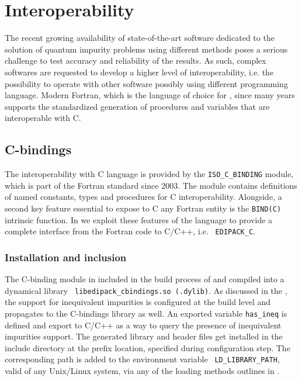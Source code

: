 \documentclass[edipack_sp.tex]{subfiles}
\begin{document}
\section{Interoperability}\label{SecInterop}
The recent growing availability of state-of-the-art software dedicated
to the solution of quantum impurity problems using different methods \cite{Bulla2008RMP,Parcollet2015CPC,Seth2016CPC,Bauernfeind2017PRX,Ganahl2015PRB,Mejuto_Bath_ASCI-DMFT,...}
poses a serious challenge to test accuracy and reliability of the
results.
As such, complex softwares are requested to develop a higher level of
interoperability, i.e. the possibility to operate with other software
possibly using different programming language.
Modern Fortran, which is the language of choice for \NAME, since many
years supports the standardized generation of procedures and
variables that are interoperable with C.


\subsection{C-bindings}\label{sSecInteropCbindings}
The interoperability with C language is provided by the
{\tt ISO\_C\_BINDING} module, which is part of the Fortran
standard since 2003. The module contains definitions of named
constants, types and procedures for C interoperability.
Alongside, a second key feature essential to expose to C any Fortran
entity is the {\tt BIND(C)} intrinsic function.
In \NAME we exploit these features of the language to provide a
complete interface from the Fortran code to C/C++, i.e. {\tt
  EDIPACK\_C}. 


\subsubsection{Installation and inclusion}\label{sSecInteropCbindingsInstallation}
The C-binding module in included in the build process of \NAME and
compiled into a dynamical library {\tt
  libedipack\_cbindings.so (.dylib)}. As discussed in the
, the support for inequivalent
impurities is configured at the build level and propagates to the
C-bindings library as well. An exported variable {\tt has\_ineq} is
defined and export to C/C++ as a way to query the presence of
inequivalent impurities support. 
The generated library and header files get installed in the include
directory at the prefix location, specified during configuration
step. The corresponding path is added to the environment variable {\tt
  LD\_LIBRARY\_PATH}, valid of any Unix/Linux system, via any of the
loading methods outlines in . 
\end{document}
